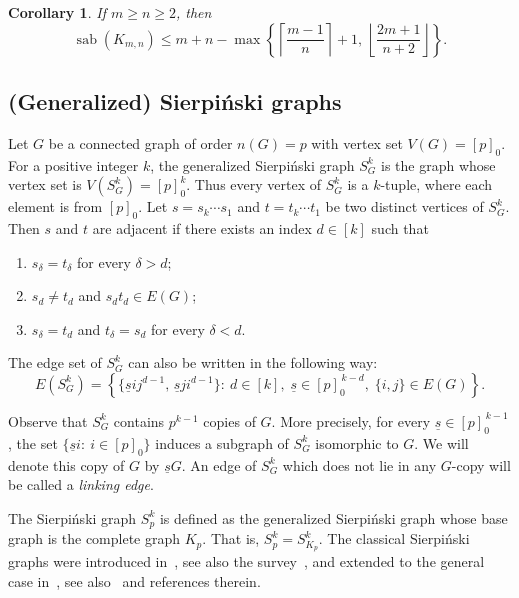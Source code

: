 \documentclass[10pt,a4paper]{amsart}
\newtheorem{corollary}[theorem]{Corollary}
\DeclareMathOperator{\sab}{\mathrm{sab}}
\begin{document}
\begin{corollary}
\label{cor:complete_bipartite_both}
If $m \ge n \ge 2$, then
$$\sab(K_{m,n}) \le m + n - \max\left\{\left\lceil\frac{m-1}{n}\right\rceil+1,\, \left\lfloor\frac{2m+1}{n+2}\right\rfloor \right\}.$$
\end{corollary}

\subsection{(Generalized) Sierpi\'nski graphs}
\label{sec:sierpinski}

Let $G$ be a connected graph of order $n(G)=p$ with vertex set $V(G)=[p]_0$. For a positive integer $k$, the generalized Sierpi\'nski graph $S^k_G$ is the graph whose vertex set is $V(S^k_G)=[p]^k_0$. Thus every vertex of $S^k_G$ is a $k$-tuple, where each element is from $[p]_0$. Let $s=s_k\cdots s_1$ and $t=t_k\cdots t_1$ be two distinct vertices of $S^k_G$. Then $s$ and $t$ are adjacent if there exists an index $d \in [k]$ such that

\begin{enumerate}
\item $s_\delta=t_\delta$ for every $\delta>d$;
\item $s_d\neq t_d$ and $s_dt_d \in E(G)$;
\item $s_\delta=t_d$ and $t_\delta=s_d$ for every $\delta<d$.
\end{enumerate}

\noindent The edge set of $S^k_G$ can also be written in the following way:
$$E(S^k_G)=\left\{\{\underline{s}ij^{d-1},\,\underline{s}ji^{d-1}\} :\ d\in[k],\; \underline{s}\in[p]_0^{\,k-d},\; \{i,j\}\in E(G)\right\}.$$

Observe that $S_G^k$ contains $p^{k-1}$ copies of $G$. More precisely, for every
$\underline{s}\in [p]_0^{\,k-1}$, the set $\{\underline{s}i :\ i\in [p]_0\}$ induces a subgraph of $S_G^k$ isomorphic to $G$. We will denote this copy of $G$ by $\underline{s}G$. An edge of $S_G^k$ which does not lie in any $G$-copy will be called a \emph{linking edge}.

The Sierpi\'nski graph $S^k_p$ is defined as the generalized Sierpi\'nski graph whose base graph is the complete graph $K_p$. That is, $S^k_p=S^k_{K_p}$. The classical Sierpi\'nski graphs were introduced in~\cite{klavzar-1997}, see also the survey~\cite{hinz-2017}, and extended to the general case in~\cite{gravier-2011}, see also~\cite{menon-2025} and references therein. 
\end{document}
